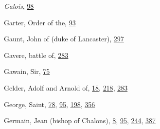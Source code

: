 \emph{Galois},
\protect\hyperlink{10_Chapter_Three__THE_HEROIC_DREAM.xhtmlux5cux23page_98}{98}

Garter, Order of the,
\protect\hyperlink{10_Chapter_Three__THE_HEROIC_DREAM.xhtmlux5cux23page_93}{93}

Gaunt, John of (duke of Lancaster),
\protect\hyperlink{19_Chapter_Twelve__ART_IN_LIFE.xhtmlux5cux23page_297}{297}

Gavere, battle of,
\protect\hyperlink{18_Chapter_Eleven__THE_FORMS_OF_THO.xhtmlux5cux23page_283}{283}

Gawain, Sir,
\protect\hyperlink{10_Chapter_Three__THE_HEROIC_DREAM.xhtmlux5cux23page_75}{75}

Gelder, Adolf and Arnold of,
\protect\hyperlink{08_Chapter_One__THE_PASSIONATE_INTE.xhtmlux5cux23page_18}{18},
\protect\hyperlink{14_Chapter_Seven__THE_PIOUS_PERSONA.xhtmlux5cux23page_218}{218},
\protect\hyperlink{18_Chapter_Eleven__THE_FORMS_OF_THO.xhtmlux5cux23page_283}{283}

George, Saint,
\protect\hyperlink{10_Chapter_Three__THE_HEROIC_DREAM.xhtmlux5cux23page_78}{78},
\protect\hyperlink{10_Chapter_Three__THE_HEROIC_DREAM.xhtmlux5cux23page_95}{95},
\protect\hyperlink{13_Chapter_Six__THE_DEPICTION_OF_TH.xhtmlux5cux23page_198}{198},
\protect\hyperlink{21_Chapter_Thirteen__IMAGE_AND_WORD.xhtmlux5cux23page_356}{356}

Germain, Jean (bishop of Chalons),
\protect\hyperlink{08_Chapter_One__THE_PASSIONATE_INTE.xhtmlux5cux23page_8}{8},
\protect\hyperlink{10_Chapter_Three__THE_HEROIC_DREAM.xhtmlux5cux23page_95}{95},
\protect\hyperlink{16_Chapter_Nine__THE_DECLINE_OF_SYM.xhtmlux5cux23page_244}{244},
\protect\hyperlink{22_Chapter_Fourteen__THE_COMING_OF.xhtmlux5cux23page_387}{387}

